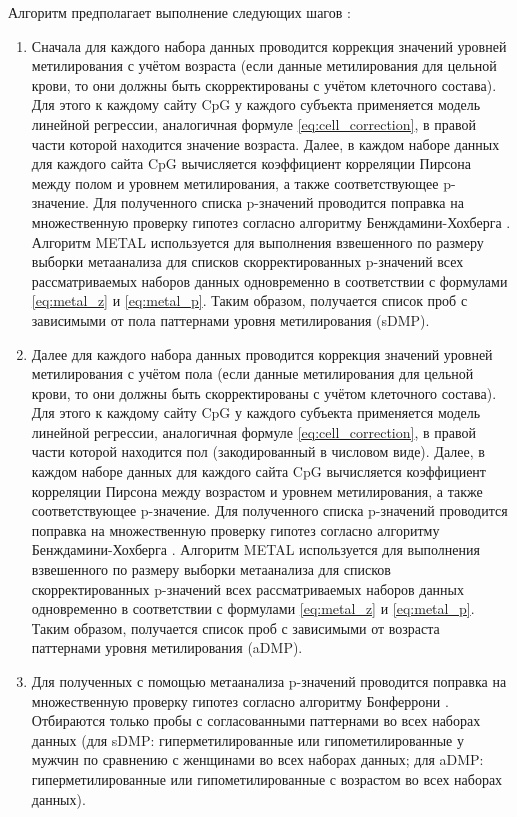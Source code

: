 Алгоритм предполагает выполнение следующих шагов \autocite{Yusipov2020}:
\begin{enumerate}
	\item Сначала для каждого набора данных проводится коррекция значений уровней метилирования с учётом возраста (если данные метилирования для цельной крови, то они должны быть скорректированы с учётом клеточного состава). Для этого к каждому сайту CpG у каждого субъекта применяется модель линейной регрессии, аналогичная формуле \ref{eq:cell_correction}, в правой части которой находится значение возраста. Далее, в каждом наборе данных для каждого сайта CpG вычисляется коэффициент корреляции Пирсона \autocite{royal1895proceedings} между полом и уровнем метилирования, а также соответствующее p-значение. Для полученного списка p-значений проводится поправка на множественную проверку гипотез согласно алгоритму Бенждамини-Хохберга \autocite{Benjamini1995}. Алгоритм METAL \autocite{Willer2010} используется для выполнения взвешенного по размеру выборки метаанализа для списков скорректированных p-значений всех рассматриваемых наборов данных одновременно в соответствии с формулами \ref{eq:metal_z} и \ref{eq:metal_p}. Таким образом, получается список проб с зависимыми от пола паттернами уровня метилирования (sDMP).
	\item Далее для каждого набора данных проводится коррекция значений уровней метилирования с учётом пола (если данные метилирования для цельной крови, то они должны быть скорректированы с учётом клеточного состава). Для этого к каждому сайту CpG у каждого субъекта применяется модель линейной регрессии, аналогичная формуле \ref{eq:cell_correction}, в правой части которой находится пол (закодированный в числовом виде). Далее, в каждом наборе данных для каждого сайта CpG вычисляется коэффициент корреляции Пирсона \autocite{royal1895proceedings} между возрастом и уровнем метилирования, а также соответствующее p-значение. Для полученного списка p-значений проводится поправка на множественную проверку гипотез согласно алгоритму Бенждамини-Хохберга \autocite{Benjamini1995}. Алгоритм METAL \autocite{Willer2010} используется для выполнения взвешенного по размеру выборки метаанализа для списков скорректированных p-значений всех рассматриваемых наборов данных одновременно в соответствии с формулами \ref{eq:metal_z} и \ref{eq:metal_p}. Таким образом, получается список проб с зависимыми от возраста паттернами уровня метилирования (aDMP).
	\item Для полученных с помощью метаанализа p-значений проводится поправка на множественную проверку гипотез согласно алгоритму Бонферрони \autocite{bonferroni1936teoria}. Отбираются только пробы с согласованными паттернами во всех наборах данных (для sDMP: гиперметилированные или гипометилированные у мужчин по сравнению с женщинами во всех наборах данных; для aDMP: гиперметилированные или гипометилированные с возрастом во всех наборах данных).

\end{enumerate}
